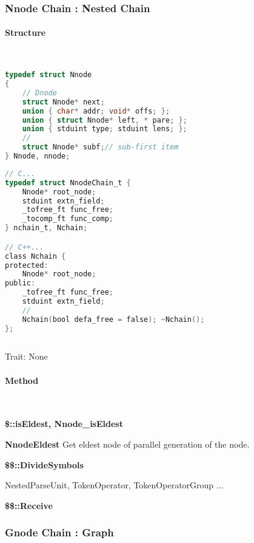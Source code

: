 \subsubsection{Nnode Chain : Nested Chain}

\paragraph{Structure} \

\lstset{style=GlobalC}
\begin{lstlisting}[language=C]
typedef struct Nnode
{
	// Dnode
	struct Nnode* next;
	union { char* addr; void* offs; };
	union { struct Nnode* left, * pare; };
	union { stduint type; stduint lens; };
	//
	struct Nnode* subf;// sub-first item
} Nnode, nnode;
\end{lstlisting}

\lstset{style=GlobalC}
\begin{lstlisting}[language=C]
// C...
typedef struct NnodeChain_t {
	Nnode* root_node;
	stduint extn_field;
	_tofree_ft func_free;
	_tocomp_ft func_comp;
} nchain_t, Nchain;

// C++...
class Nchain {
protected:
	Nnode* root_node;
public:
	_tofree_ft func_free;
	stduint extn_field;
	//
	Nchain(bool defa_free = false); ~Nchain();
};
	
\end{lstlisting}

Trait: None

\paragraph{Method} \


\textbf{\$::isEldest, Nnode\_isEldest}

\textbf{NnodeEldest}
Get eldest node of parallel generation of the node.

\textbf{\$\$::DivideSymbols}

NestedParseUnit, TokenOperator, TokenOperatorGroup ...


\textbf{\$\$::Receive}


\subsubsection{Gnode Chain : Graph}


